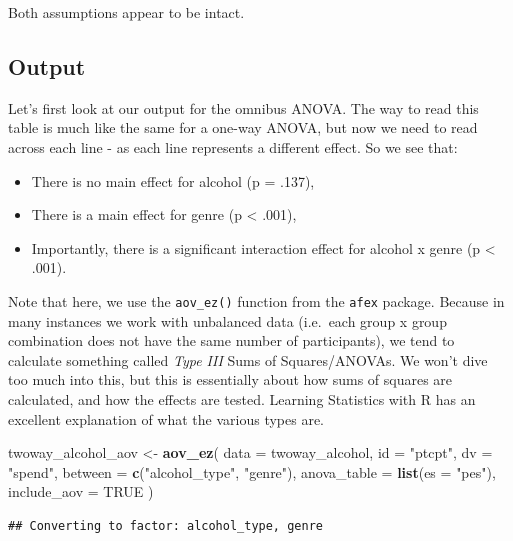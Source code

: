\documentclass[
]{book}
\newenvironment{Shaded}{\begin{snugshade}}{\end{snugshade}}
\newcommand{\AttributeTok}[1]{\textcolor[rgb]{0.13,0.29,0.53}{#1}}
\newcommand{\ConstantTok}[1]{\textcolor[rgb]{0.56,0.35,0.01}{#1}}
\newcommand{\FunctionTok}[1]{\textcolor[rgb]{0.13,0.29,0.53}{\textbf{#1}}}
\newcommand{\NormalTok}[1]{#1}
\newcommand{\OtherTok}[1]{\textcolor[rgb]{0.56,0.35,0.01}{#1}}
\newcommand{\StringTok}[1]{\textcolor[rgb]{0.31,0.60,0.02}{#1}}
\providecommand{\tightlist}{%
  \setlength{\itemsep}{0pt}\setlength{\parskip}{0pt}}
\begin{document}
Both assumptions appear to be intact.

\hypertarget{output-7}{%
\subsection{Output}\label{output-7}}

Let's first look at our output for the omnibus ANOVA. The way to read this table is much like the same for a one-way ANOVA, but now we need to read across each line - as each line represents a different effect. So we see that:

\begin{itemize}
\tightlist
\item
  There is no main effect for alcohol (p = .137),
\item
  There is a main effect for genre (p \textless{} .001),
\item
  Importantly, there is a significant interaction effect for alcohol x genre (p \textless{} .001).
\end{itemize}

Note that here, we use the \texttt{aov\_ez()} function from the \texttt{afex} package. Because in many instances we work with unbalanced data (i.e.~each group x group combination does not have the same number of participants), we tend to calculate something called \emph{Type III} Sums of Squares/ANOVAs. We won't dive too much into this, but this is essentially about how sums of squares are calculated, and how the effects are tested. Learning Statistics with R has an excellent explanation of what the various types are.

\begin{Shaded}
\begin{Highlighting}[]
\NormalTok{twoway\_alcohol\_aov }\OtherTok{\textless{}{-}} \FunctionTok{aov\_ez}\NormalTok{(}
  \AttributeTok{data =}\NormalTok{ twoway\_alcohol,}
  \AttributeTok{id =} \StringTok{"ptcpt"}\NormalTok{,}
  \AttributeTok{dv =} \StringTok{"spend"}\NormalTok{,}
  \AttributeTok{between =} \FunctionTok{c}\NormalTok{(}\StringTok{"alcohol\_type"}\NormalTok{, }\StringTok{"genre"}\NormalTok{),}
  \AttributeTok{anova\_table =} \FunctionTok{list}\NormalTok{(}\AttributeTok{es =} \StringTok{"pes"}\NormalTok{),}
  \AttributeTok{include\_aov =} \ConstantTok{TRUE}
\NormalTok{)}
\end{Highlighting}
\end{Shaded}

\begin{verbatim}
## Converting to factor: alcohol_type, genre
\end{verbatim}
\end{document}

